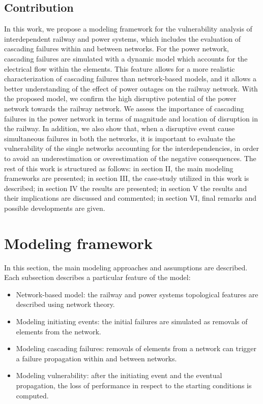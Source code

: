 \documentclass[review]{elsarticle}
\begin{document}
	\subsection{Contribution}
	In this work, we propose a modeling framework for the vulnerability analysis of interdependent railway and power systems, which includes the evaluation of cascading failures within and between networks. For the power network, cascading failures are simulated with a dynamic model which accounts for the electrical flow within the elements. This feature allows for a more realistic characterization of cascading failures than network-based models, and it allows a better understanding of the effect of power outages on the railway network. With the proposed model, we confirm the high disruptive potential of the power network towards the railway network. We assess the importance of cascading failures in the power network in terms of magnitude and location of disruption in the railway. In addition, we also show that, when a disruptive event cause simultaneous failures in both the networks, it is important to evaluate the vulnerability of the single networks accounting for the interdependencies, in order to avoid an underestimation or overestimation of the negative consequences. The rest of this work is structured as follows: in section II, the main modeling frameworks are presented; in section III, the case-study utilized in this work is described; in section IV the results are presented; in section V the results and their implications are discussed and commented; in section VI, final remarks and possible developments are given.

	
	\section{Modeling framework}
	In this section, the main modeling approaches and assumptions are described. Each subsection describes a particular feature of the model: 
	\begin{itemize}
	    \item Network-based model: the railway and power systems topological features are described using network theory.
	    \item Modeling initiating events: the initial failures are simulated as removals of elements from the network.
	    \item Modeling cascading failures: removals of elements from a network can trigger a failure propagation within and between networks.
	    \item Modeling vulnerability: after the initiating event and the eventual propagation, the loss of performance in respect to the starting conditions is computed.
	\end{itemize}
	
\end{document}
